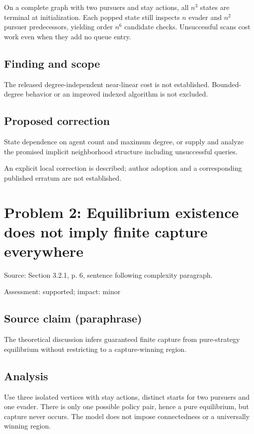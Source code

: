 \documentclass[11pt]{article}
\begin{document}
On a complete graph with two pursuers and stay actions, all \(n^3\) states are terminal at initialization. Each popped state still inspects \(n\) evader and \(n^2\) pursuer predecessors, yielding order \(n^6\) candidate checks. Unsuccessful scans cost work even when they add no queue entry.

\subsection*{Finding and scope}

The released degree-independent near-linear cost is not established. Bounded-degree behavior or an improved indexed algorithm is not excluded.

\subsection*{Proposed correction}

State dependence on agent count and maximum degree, or supply and analyze the promised implicit neighborhood structure including unsuccessful queries.

An explicit local correction is described; author adoption and a corresponding published erratum are not established.

\section*{Problem 2: Equilibrium existence does not imply finite capture everywhere}

Source: Section 3.2.1, p. 6, sentence following complexity paragraph.

Assessment: supported; impact: minor

\subsection*{Source claim (paraphrase)}

The theoretical discussion infers guaranteed finite capture from pure-strategy equilibrium without restricting to a capture-winning region.

\subsection*{Analysis}

Use three isolated vertices with stay actions, distinct starts for two pursuers and one evader. There is only one possible policy pair, hence a pure equilibrium, but capture never occurs. The model does not impose connectedness or a universally winning region.
\end{document}
